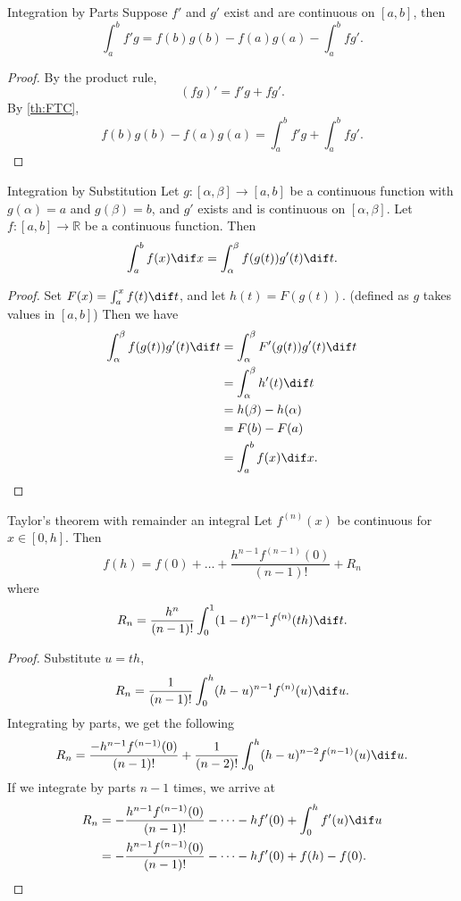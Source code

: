 \begin{corollary}{Integration by Parts}{}
    Suppose \(f'\) and \(g'\) exist and are continuous on \([a,b]\), then
    \[
        \int^b_a f'g = f(b)g(b) - f(a)g(a) - \int^b_a fg'.
    \]
\end{corollary}
\begin{proof}
    By the product rule,
    \[
        (fg)' = f'g + fg'.
    \]
    By \cref{th:FTC},
    \[
        f(b)g(b) - f(a)g(a) = \int^b_a f'g + \int^b_a fg'.
    \]
\end{proof}
\begin{corollary}{Integration by Substitution}{}
    Let \(g: [\alpha, \beta] \to [a,b]\) be a continuous function with \(g(\alpha) = a\) and \(g(\beta) = b\), and \(g'\) exists and is continuous on \([\alpha, \beta]\). Let \(f: [a,b] \to \mathbb{R}\) be a continuous function. Then
    \[
        \int^b_a f(x) \dif x = \int^\beta_\alpha f(g(t))g'(t) \dif t.
    \]
\end{corollary}
\begin{proof}
    Set \(F(x) = \int^x_a f(t) \dif t\), and let \(h(t) = F(g(t))\). (defined as \(g\) takes values in \([a,b]\)) Then we have
    \begin{align*}
        \int^\beta_\alpha f(g(t))g'(t)\dif t &= \int^\beta_\alpha F'(g(t))g'(t) \dif t\\
        &= \int^\beta_\alpha h'(t) \dif t\\
        &= h(\beta) - h(\alpha)\\
        &= F(b) - F(a)\\
        &= \int^b_a f(x) \dif x.
    \end{align*}
\end{proof}
\begin{theorem}{Taylor's theorem with remainder an integral}{}
    Let \(f^(n)(x)\) be continuous for \(x \in [0,h]\). Then
    \[
        f(h) = f(0) + \dots + \frac{h^{n-1}f^{(n-1)}(0)}{(n-1)!} + R_n
    \]
    where
    \[
        R_n = \frac{h^n}{(n-1)!}\int^1_0 (1-t)^{n-1} f^{(n)}(th) \dif t.
    \]
\end{theorem}
\begin{proof}
    Substitute \(u = th\),
    \[
        R_n = \frac{1}{(n-1)!}\int^h_0 (h-u)^{n-1}f^{(n)}(u) \dif u.
    \]
    Integrating by parts, we get the following
    \[
        R_n = \frac{-h^{n-1}f^{(n-1)}(0)}{(n-1)!} + \frac{1}{(n-2)!}\int^h_0(h-u)^{n-2}f^{(n-1)}(u)\dif u.
    \]
    If we integrate by parts \(n-1\) times, we arrive at
    \begin{align*}
        R_n &= -\frac{h^{n-1}f^{(n-1)}(0)}{(n-1)!} - \dots - hf'(0) + \int^h_0 f'(u) \dif u\\
        &= -\frac{h^{n-1}f^{(n-1)}(0)}{(n-1)!} - \dots - hf'(0) + f(h) - f(0).
    \end{align*}
\end{proof}
